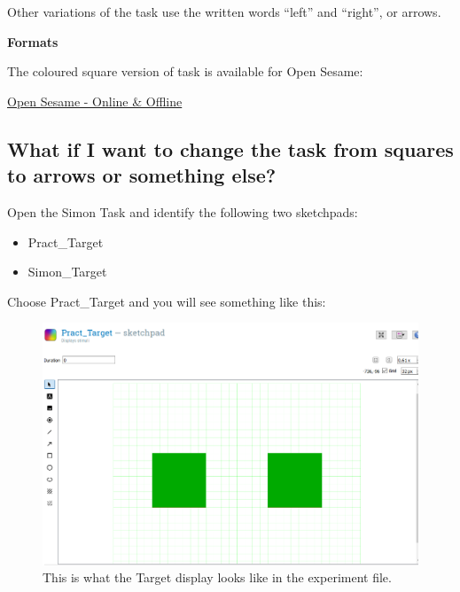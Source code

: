 \documentclass[
]{book}
\begin{document}
Other variations of the task use the written words ``left'' and ``right'', or arrows.

\textbf{Formats}

The coloured square version of task is available for Open Sesame:

\href{https://github.com/jmattschey/MScConversionExperiments/blob/master/GitHub/SimonTask.zip}{Open Sesame - Online \& Offline}

\hypertarget{what-if-i-want-to-change-the-task-from-squares-to-arrows-or-something-else}{%
\subsection{What if I want to change the task from squares to arrows or something else?}\label{what-if-i-want-to-change-the-task-from-squares-to-arrows-or-something-else}}

Open the Simon Task and identify the following two sketchpads:

\begin{itemize}
\item
  Pract\_Target
\item
  Simon\_Target
\end{itemize}

Choose Pract\_Target and you will see something like this:

\begin{figure}

{\centering \includegraphics[width=0.99\linewidth]{images/changesimon/01Pract_Target} 

}

\caption{This is what the Target display looks like in the experiment file.}\label{fig:Figure3-5}
\end{figure}
\end{document}
